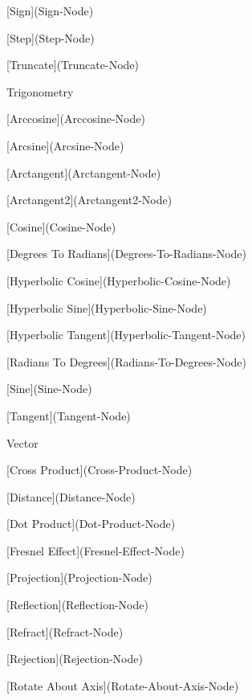 \begin{DoxyItemize}
\begin{DoxyItemize}
\begin{DoxyItemize}
\begin{DoxyItemize}
\item \mbox{[}Sign\mbox{]}(Sign-\/\+Node)
\item \mbox{[}Step\mbox{]}(Step-\/\+Node)
\item \mbox{[}Truncate\mbox{]}(Truncate-\/\+Node)
\end{DoxyItemize}
\item Trigonometry
\begin{DoxyItemize}
\item \mbox{[}Arccosine\mbox{]}(Arccosine-\/\+Node)
\item \mbox{[}Arcsine\mbox{]}(Arcsine-\/\+Node)
\item \mbox{[}Arctangent\mbox{]}(Arctangent-\/\+Node)
\item \mbox{[}Arctangent2\mbox{]}(Arctangent2-\/\+Node)
\item \mbox{[}Cosine\mbox{]}(Cosine-\/\+Node)
\item \mbox{[}Degrees To Radians\mbox{]}(Degrees-\/\+To-\/\+Radians-\/\+Node)
\item \mbox{[}Hyperbolic Cosine\mbox{]}(Hyperbolic-\/\+Cosine-\/\+Node)
\item \mbox{[}Hyperbolic Sine\mbox{]}(Hyperbolic-\/\+Sine-\/\+Node)
\item \mbox{[}Hyperbolic Tangent\mbox{]}(Hyperbolic-\/\+Tangent-\/\+Node)
\item \mbox{[}Radians To Degrees\mbox{]}(Radians-\/\+To-\/\+Degrees-\/\+Node)
\item \mbox{[}Sine\mbox{]}(Sine-\/\+Node)
\item \mbox{[}Tangent\mbox{]}(Tangent-\/\+Node)
\end{DoxyItemize}
\item Vector
\begin{DoxyItemize}
\item \mbox{[}Cross Product\mbox{]}(Cross-\/\+Product-\/\+Node)
\item \mbox{[}Distance\mbox{]}(Distance-\/\+Node)
\item \mbox{[}Dot Product\mbox{]}(Dot-\/\+Product-\/\+Node)
\item \mbox{[}Fresnel Effect\mbox{]}(Fresnel-\/\+Effect-\/\+Node)
\item \mbox{[}Projection\mbox{]}(Projection-\/\+Node)
\item \mbox{[}Reflection\mbox{]}(Reflection-\/\+Node)
\item \mbox{[}Refract\mbox{]}(Refract-\/\+Node)
\item \mbox{[}Rejection\mbox{]}(Rejection-\/\+Node)
\item \mbox{[}Rotate About Axis\mbox{]}(Rotate-\/\+About-\/\+Axis-\/\+Node)

\end{DoxyItemize}
\end{DoxyItemize}
\end{DoxyItemize}
\end{DoxyItemize}
